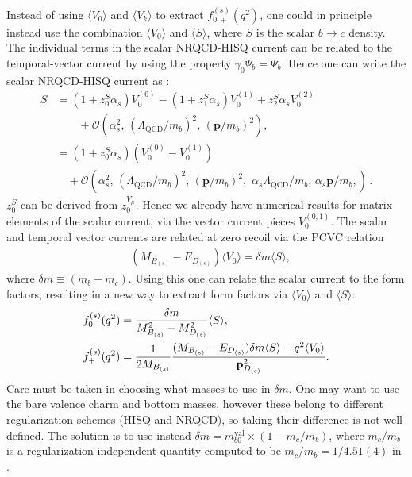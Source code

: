 Instead of using $\langle V_0 \rangle$ and $\langle V_k \rangle$ to extract $f^{(s)}_{0,+}(q^2)$, one could in principle instead use the combination $\langle V_0 \rangle$ and $\langle S \rangle$, where $S$ is the scalar $b\to c$ density. The individual terms in the scalar NRQCD-HISQ current can be related to the temporal-vector current by using the property $\gamma_0 \Psi_b = \Psi_b$. Hence one can write the scalar NRQCD-HISQ current as \cite{Hughes:2017spc}:
\begin{align}
  S &= (1+z_0^S\alpha_s)V^{(0)}_0 - (1+z_1^S\alpha_s)V^{(1)}_0 + z_2^S\alpha_sV_0^{(2)}\\ \nonumber &\quad\quad + \mathcal{O}(\alpha_s^2,\, (\Lambda_{\text{QCD}}/m_b)^2,\, ({\textbf{p}}/m_b)^2 ), \\
  &= (1+z_0^S\alpha_s)( V^{(0)}_0 - V_0^{(1)} )  \\ \nonumber &\quad + \mathcal{O}(\alpha_s^2,\, (\Lambda_{\text{QCD}}/m_b)^2,\, ({\textbf{p}}/m_b)^2,\,\, \alpha_s \Lambda_{\text{QCD}} / m_b,\, \alpha_s {\textbf{p}}/m_b, )\,.
\end{align}
$z_0^S$ can be derived from $z_0^{V_{\mu}}$. Hence we already have numerical results for matrix elements of the scalar current, via the vector current pieces $V^{(0,1)}_0$. The scalar and temporal vector currents are related at zero recoil via the PCVC relation
\begin{align}
  &(M_{B_{(s)}}-E_{D_{(s)}})\langle V_0 \rangle = \delta m \langle S \rangle,
\end{align}
where $\delta m \equiv (m_b-m_c)$. Using this one can relate the scalar current to the form factors, resulting in a new way to extract form factors via $\langle V_0 \rangle$ and $\langle S \rangle$:
\begin{align}
  f_0^{(s)}(q^2) &= {\delta m\over M_{B_{(s)}}^2 - M_{D_{(s)}}^2 } \langle S \rangle, \\
  f_+^{(s)}(q^2) &= {1\over 2M_{B_{(s)}}} { (M_{B_{(s)}}-E_{D_{(s)}}) \delta m \langle S \rangle - q^2 \langle V_0 \rangle \over {\bf{p}}^2_{D_{(s)}}}. \label{eq:fplus_badness}
\end{align}
Care must be taken in choosing what masses to use in $\delta m$. One may want to use the bare valence charm and bottom masses, however these belong to different regularization schemes (HISQ and NRQCD), so taking their difference is not well defined. The solution is to use instead $\delta m = m^{\text{val}}_{b0} \times ( 1 - m_c/m_b)$, where $m_c/m_b$ is a regularization-independent quantity computed to be $m_c/m_b = 1/4.51(4)$ in \cite{McNeile:2010ji}.

